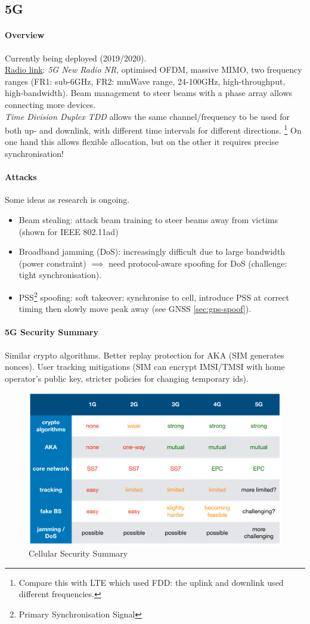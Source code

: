 \subsection{5G}

\paragraph{Overview}
Currently being deployed (2019/2020).
\\
\underline{Radio link}: \textit{5G New Radio NR}, optimised OFDM, massive MIMO, two frequency ranges (FR1: sub-6GHz, FR2: mmWave range, 24-100GHz, high-throughput, high-bandwidth).
Beam management to steer beams with a phase array allows connecting more devices.
\\
\textit{Time Division Duplex TDD} allows the same channel/frequency to be used for both up- and downlink, with different time intervals for different directions.%
\footnote{Compare this with LTE which used FDD: the uplink and downlink used different frequencies.}
On one hand this allows flexible allocation, but on the other it requires precise synchronisation!

\paragraph{Attacks}
Some ideas as research is ongoing.
\begin{itemize}
	\item Beam stealing: attack beam training to steer beams away from victims (shown for IEEE 802.11ad)
	\item Broadband jamming (DoS): increasingly difficult due to large bandwidth (power constraint) $\implies$ need protocol-aware spoofing for DoS (challenge: tight synchronisation).
	\item PSS\footnote{Primary Synchronisation Signal} spoofing:
	soft takeover: synchronise to cell, introduce PSS at correct timing then slowly move peak away (see GNSS \autoref{sec:gps-spoof}).
\end{itemize}

\paragraph{5G Security Summary}
Similar crypto algorithms.
Better replay protection for AKA (SIM generates nonces).
User tracking mitigations (SIM can encrypt IMSI/TMSI with home operator's public key, stricter policies for changing temporary ids).

\begin{figure}[h]
	\centering
	\includegraphics[scale=0.5]{images/10-overview.png}
	\caption{Cellular Security Summary}
	\label{fig:overview}
\end{figure}


